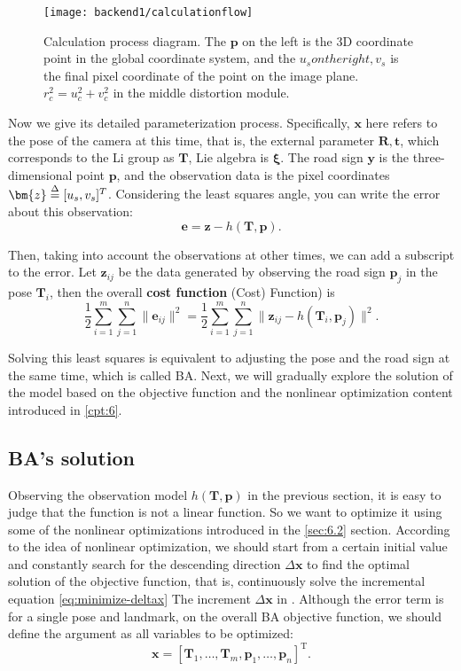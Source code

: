 \begin{figure}[!htp]
\centering
\texttt{[image: backend1/calculationflow]}
\caption{Calculation process diagram. The $\bm{p}$ on the left is the 3D coordinate point in the global coordinate system, and the $u_s on the right, v_s$ is the final pixel coordinate of the point on the image plane. $r_c^2=u_c^2 + v_c^2$ in the middle distortion module. }
\label{fig:calculationflow}
\end{figure}

Now we give its detailed parameterization process. Specifically, $\bm{x}$ here refers to the pose of the camera at this time, that is, the external parameter $\bm{R}, \bm{t}$, which corresponds to the Li group as $\bm{T }$, Lie algebra is $\bm{\xi}$. The road sign $\bm{y}$ is the three-dimensional point $\bm{p}$, and the observation data is the pixel coordinates $\bm{z} \buildrel \Delta \over = [u_s, v_s]^T $. Considering the least squares angle, you can write the error about this observation:
\begin{equation}
\bm{e} = \bm{z} - h(\bm{T}, \bm{p}).
\end{equation}

Then, taking into account the observations at other times, we can add a subscript to the error. Let $\bm{z}_{ij}$ be the data generated by observing the road sign $\bm{p}_j$ in the pose $\bm{T}_i$, then the overall \textbf{cost function} (Cost) Function) is
\begin{equation}
\label{eq:BAcostfunction}
\frac{1}{2}\sum_{i=1}^m \sum_{j=1}^n \| \bm{e}_{ij} \|^2 = \frac{1}{2}\sum_{i=1}^m\sum_{j=1}^n \|
\bm{{z}}_{ij} - h(\bm{T}_{i},\bm{p}_j) \|^2 .
\end{equation}

Solving this least squares is equivalent to adjusting the pose and the road sign at the same time, which is called BA. Next, we will gradually explore the solution of the model based on the objective function and the nonlinear optimization content introduced in \ref{cpt:6}.

\subsection{BA's solution}
Observing the observation model $h(\bm{T}, \bm{p})$ in the previous section, it is easy to judge that the function is not a linear function. So we want to optimize it using some of the nonlinear optimizations introduced in the \ref{sec:6.2} section. According to the idea of ​​nonlinear optimization, we should start from a certain initial value and constantly search for the descending direction $\Delta \bm{x}$ to find the optimal solution of the objective function, that is, continuously solve the incremental equation \eqref{eq:minimize-deltax} The increment $\Delta \bm{x}$ in . Although the error term is for a single pose and landmark, on the overall BA objective function, we should define the argument as all variables to be optimized:
\begin{equation}
\bm{x} = [ \bm{T}_1, \ldots, \bm{T}_m, \bm{p}_1, \ldots, \bm{p}_n ]^\mathrm{T}.
\end{equation}

